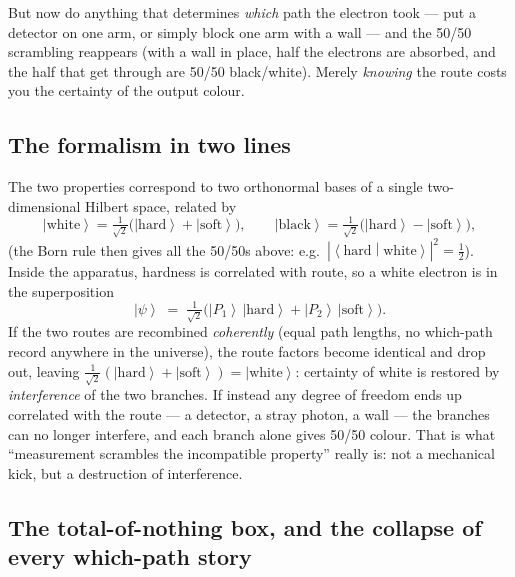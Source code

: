 \documentclass[11pt,a4paper]{article}
\newcommand{\ket}[1]{\left|#1\right\rangle}
\newcommand{\braket}[2]{\left\langle#1\middle|#2\right\rangle}
\newcommand{\hard}{\ket{\mathrm{hard}}}
\newcommand{\soft}{\ket{\mathrm{soft}}}
\newcommand{\white}{\ket{\mathrm{white}}}
\newcommand{\black}{\ket{\mathrm{black}}}
\theoremstyle{remark}
\begin{document}
But now do anything that determines \emph{which} path the electron took ---
put a detector on one arm, or simply block one arm with a wall --- and the 50/50
scrambling reappears (with a wall in place, half the electrons are absorbed, and the
half that get through are 50/50 black/white). Merely \emph{knowing} the route costs
you the certainty of the output colour.

\subsection{The formalism in two lines}

The two properties correspond to two orthonormal bases of a single two-dimensional
Hilbert space, related by
\begin{equation}
  \white = \tfrac{1}{\sqrt2}\bigl(\hard + \soft\bigr), \qquad
  \black = \tfrac{1}{\sqrt2}\bigl(\hard - \soft\bigr),
  \label{eq:bases}
\end{equation}
(the Born rule then gives all the 50/50s above: e.g.\
$|\braket{\mathrm{hard}}{\mathrm{white}}|^2 = \tfrac12$).
Inside the apparatus, hardness is correlated with route, so a white electron is in
the superposition
\begin{equation}
  \ket{\psi} \;=\; \tfrac{1}{\sqrt2}\bigl(\ket{P_1}\,\hard + \ket{P_2}\,\soft\bigr).
\end{equation}
If the two routes are recombined \emph{coherently} (equal path lengths, no
which-path record anywhere in the universe), the route factors become identical and
drop out, leaving $\tfrac{1}{\sqrt2}(\hard+\soft) = \white$: certainty of white is
restored by \emph{interference} of the two branches. If instead any degree of
freedom ends up correlated with the route --- a detector, a stray photon, a wall ---
the branches can no longer interfere, and each branch alone gives 50/50 colour.
That is what ``measurement scrambles the incompatible property'' really is: not a
mechanical kick, but a destruction of interference.

\subsection{The total-of-nothing box, and the collapse of every which-path story}
\end{document}
